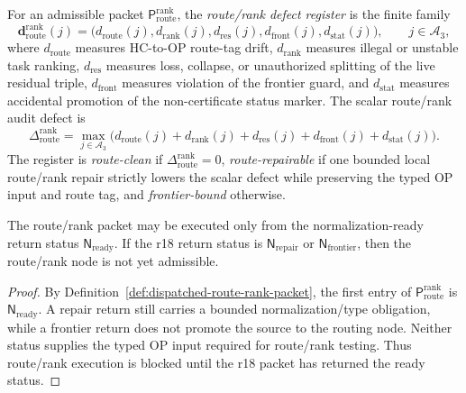 \begin{definition}
\label{def:route-rank-defect-register}
For an admissible packet \(\mathsf P_{\mathrm{route}}^{\mathrm{rank}}\), the \emph{route/rank defect register} is the finite family
\[
  \mathbf d_{\mathrm{route}}^{\mathrm{rank}}(j)
  =
  \bigl(d_{\mathrm{route}}(j),d_{\mathrm{rank}}(j),d_{\mathrm{res}}(j),d_{\mathrm{front}}(j),d_{\mathrm{stat}}(j)\bigr),
  \qquad j\in\mathcal A_3,
\]
where \(d_{\mathrm{route}}\) measures HC-to-OP route-tag drift, \(d_{\mathrm{rank}}\) measures illegal or unstable task ranking, \(d_{\mathrm{res}}\) measures loss, collapse, or unauthorized splitting of the live residual triple, \(d_{\mathrm{front}}\) measures violation of the frontier guard, and \(d_{\mathrm{stat}}\) measures accidental promotion of the non-certificate status marker.  The scalar route/rank audit defect is
\[
  \Delta_{\mathrm{route}}^{\mathrm{rank}}
  =
  \max_{j\in\mathcal A_3}
  \bigl(d_{\mathrm{route}}(j)+d_{\mathrm{rank}}(j)+d_{\mathrm{res}}(j)+d_{\mathrm{front}}(j)+d_{\mathrm{stat}}(j)\bigr).
\]
The register is \emph{route-clean} if \(\Delta_{\mathrm{route}}^{\mathrm{rank}}=0\), \emph{route-repairable} if one bounded local route/rank repair strictly lowers the scalar defect while preserving the typed OP input and route tag, and \emph{frontier-bound} otherwise.
\end{definition}

\begin{lemma}
\label{lem:normalization-ready-return-is-route-rank-precondition}
The route/rank packet may be executed only from the normalization-ready return status \(\mathsf N_{\mathrm{ready}}\).  If the r18 return status is \(\mathsf N_{\mathrm{repair}}\) or \(\mathsf N_{\mathrm{frontier}}\), then the route/rank node is not yet admissible.
\end{lemma}

\begin{proof}
By Definition~\ref{def:dispatched-route-rank-packet}, the first entry of \(\mathsf P_{\mathrm{route}}^{\mathrm{rank}}\) is \(\mathsf N_{\mathrm{ready}}\).  A repair return still carries a bounded normalization/type obligation, while a frontier return does not promote the source to the routing node.  Neither status supplies the typed OP input required for route/rank testing.  Thus route/rank execution is blocked until the r18 packet has returned the ready status.
\end{proof}


